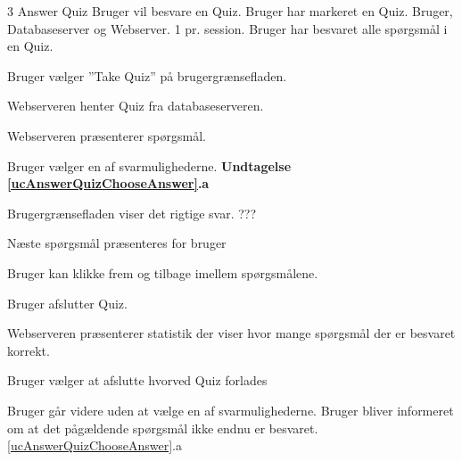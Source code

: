 \uchead
	{3}
	{Answer Quiz}
	{Bruger vil besvare en Quiz.}
	{Bruger har markeret en Quiz.}
	{Bruger, Databaseserver og Webserver.}
	{}
	{1 pr. session.}
	{Bruger har besvaret alle spørgsmål i en Quiz.}

\item Bruger vælger ''Take Quiz'' på brugergrænsefladen.

\item Webserveren henter Quiz fra databaseserveren.

\item\label{ucAnswerQuizPresent} Webserveren præsenterer spørgsmål.

\item \label{ucAnswerQuizChooseAnswer} Bruger vælger en af svarmulighederne. 
\textbf{Undtagelse \ref{ucAnswerQuizChooseAnswer}.a}

\item Brugergrænsefladen viser det rigtige svar. ???

\item\label{ucAnswerQuizEnd} Næste spørgsmål præsenteres for bruger 


\item Bruger kan klikke frem og tilbage imellem spørgsmålene.

\item Bruger afslutter Quiz.


\item Webserveren præsenterer statistik der viser hvor mange spørgsmål der er besvaret korrekt.

\item Bruger vælger at afslutte hvorved Quiz forlades

\ucdescriptionend

\ucextension
	{Bruger går videre uden at vælge en af svarmulighederne.}
	{Bruger bliver informeret om at det pågældende spørgsmål ikke endnu er besvaret.}
	{\ref{ucAnswerQuizChooseAnswer}.a}
	

